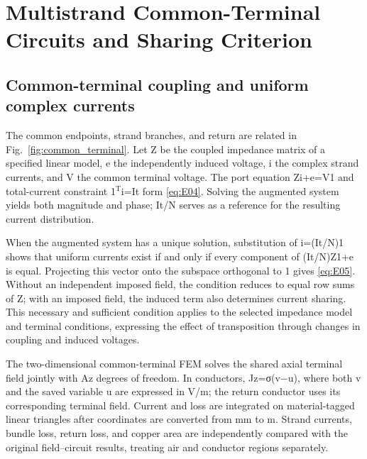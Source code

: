 \section{Multistrand Common-Terminal Circuits and Sharing Criterion}
\label{chapter:04}

\hypertarget{04.common.heading}{}
\subsection{Common-terminal coupling and uniform complex currents}

\hypertarget{04.common.p1}{}
The common endpoints, strand branches, and return are related in Fig.~\ref{fig:common_terminal}. Let Z be the coupled impedance matrix of a specified linear model, e the independently induced voltage, i the complex strand currents, and V the common terminal voltage. The port equation Zi+e=V1 and total-current constraint 1\(^{\mathrm T}\)i=It form \eqref{eq:E04}. Solving the augmented system yields both magnitude and phase; It/N serves as a reference for the resulting current distribution.

\hypertarget{04.common.p2}{}
When the augmented system has a unique solution, substitution of i=(It/N)1 shows that uniform currents exist if and only if every component of (It/N)Z1+e is equal. Projecting this vector onto the subspace orthogonal to 1 gives \eqref{eq:E05}. Without an independent imposed field, the condition reduces to equal row sums of Z; with an imposed field, the induced term also determines current sharing. This necessary and sufficient condition applies to the selected impedance model and terminal conditions, expressing the effect of transposition through changes in coupling and induced voltages.

\hypertarget{04.common.p3}{}
The two-dimensional common-terminal FEM solves the shared axial terminal field jointly with Az degrees of freedom. In conductors, Jz=σ(v−u), where both v and the saved variable u are expressed in V/m; the return conductor uses its corresponding terminal field. Current and loss are integrated on material-tagged linear triangles after coordinates are converted from mm to m. Strand currents, bundle loss, return loss, and copper area are independently compared with the original field–circuit results, treating air and conductor regions separately.

\hypertarget{04.sharing_derivation.heading}{}
